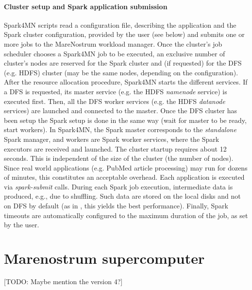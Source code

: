 \documentclass[journal]{IEEEtran}
\begin{document}
\paragraph{Cluster setup and Spark application submission}
Spark4MN scripts read a configuration file, describing the application and the Spark cluster configuration, provided by the user (see below) and submits one or more jobs to the MareNostrum workload manager. Once the cluster's job scheduler chooses a Spark4MN job to be executed, an exclusive number of cluster's nodes are reserved for the Spark cluster and (if requested) for the DFS (e.g. HDFS) cluster (may be the same nodes, depending on the configuration). After the resource allocation procedure, Spark4MN starts the different services. If a DFS is requested, its master service (e.g. the HDFS {\it namenode} service) is executed first. Then, all the DFS worker services (e.g. the HDFS {\it datanode} services) are launched and connected to the master. Once the DFS cluster has been setup the Spark setup is done in the same way (wait for master to be ready, start workers). In Spark4MN, the Spark master corresponds to the \emph{standalone} Spark manager, and workers are Spark
worker services, where the Spark executors are received and launched. The cluster startup requires about 12 seconds. This is independent of the size of the cluster (the number of nodes). Since real world applications (e.g. PubMed article processing) may run for dozens of minutes, this constitutes an acceptable overhead.
Each application is executed via {\it spark-submit} calls.
During each Spark job execution, intermediate data is produced, e.g., due to shuffling. Such data are stored on the local disks and not on DFS by default (as in \cite{michael2014}, this yields the best performance). Finally, Spark timeouts are automatically configured to the maximum duration of the job, as set by the user.

\section{Marenostrum supercomputer}
\label{sec:marenostrum}

[TODO: Maybe mention the version 4?]
\end{document}
